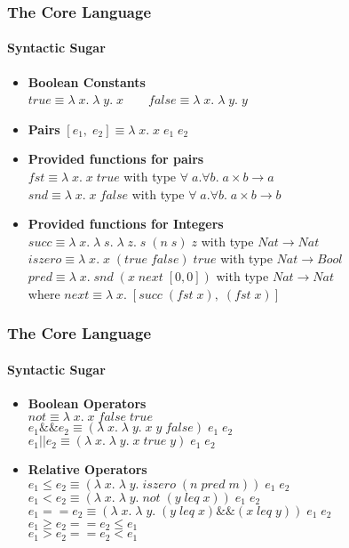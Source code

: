 \documentclass[xcolor=table]{beamer}
\begin{document}
\begin{frame}
\frametitle{The Core Language}
\framesubtitle{Syntactic Sugar}
\begin{itemize}
\item \textbf{Boolean Constants} \\
$true \equiv \lambda \; x. \; \lambda \; y.\;  x \;\;\;\;\;\;$ 
$false \equiv \lambda \; x. \; \lambda \; y.\;  y$ \\
\item \textbf{Pairs} 
$[e_1, \; e_2] \equiv \lambda \;x.\; x \; e_1 \; e_2$ \\
\item \textbf{Provided functions for pairs} \\
$fst \equiv \lambda \;x.\; x \; true$ with type $\forall \;a. \forall b. \; a \times b \rightarrow a$\\
$snd \equiv \lambda \;x.\; x \; false$ with type $\forall \;a. \forall b. \; a \times b \rightarrow b$\\
\item \textbf{Provided functions for Integers} \\
$succ \equiv \lambda \; x. \; \lambda \; s. \; \lambda \; z. \;s \; (n \; s) \; z $ with type $Nat \rightarrow Nat$\\
$iszero \equiv \lambda \; x.\; x \; (true \; false) \; true $ with type $Nat \rightarrow Bool$ \\
$pred \equiv \lambda \; x.\; snd \; (x \; next \; [0,0] )$ with type $Nat \rightarrow Nat$ \\
where $next \equiv \lambda \; x. \; [succ \; (fst\;x), \; (fst\;x)]$
\end{itemize}
\end{frame}

\begin{frame}
\frametitle{The Core Language}
\framesubtitle{Syntactic Sugar}
\begin{itemize}
\item \textbf{Boolean Operators} \\
$not \equiv \lambda \; x. \; x\; false\; true$ \\
$e_1 \&\& e_2 \equiv (\lambda \; x. \; \lambda \; y.\;  x \; y \; false) \; e_1 \; e_2$ \\
$e_1 || e_2 \equiv (\lambda \; x. \; \lambda \; y.\;  x \; true \; y) \; e_1 \; e_2$ \\
\item \textbf{Relative Operators} \\
$e_1 \leq e_2 \equiv (\lambda \; x. \; \lambda \; y.\; iszero \;(n\; pred \; m)) \; e_1 \; e_2$ \\
$e_1 < e_2 \equiv (\lambda \; x. \; \lambda \; y.\; not \;(y\; leq \; x)) \; e_1 \; e_2$ \\
$e_1 == e_2 \equiv (\lambda \; x. \; \lambda \; y.\; (y\; leq \; x) \&\&(x\; leq \; y))\; e_1 \; e_2$ \\
$e_1 \geq e_2 == e_2 \leq e_1 $ \\
$e_1 > e_2 == e_2 < e_1 $ \\
\end{itemize}
\end{frame}
\end{document}

